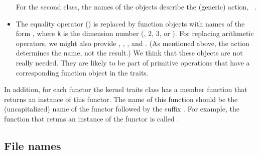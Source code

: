 \begin{itemize}
      For the second class, the names of the objects describe the (generic)
      action, \eg~.
\item The equality operator () is replaced by function
      objects with names of the form , where {\tt k} is
      the dimension number (\ie, 2, 3, or ).
      For replacing arithmetic operators, we might also provide ,
      , , and . (As mentioned
      above, the action determines the name, not the result.) We think
      that these objects are not really needed.  They are likely to be
      part of primitive operations that have a corresponding function
      object in the traits.
\end{itemize}

In addition, for each functor the kernel traits class has a member
function that returns an instance of this functor.  The name of this
function should be the (uncapitalized) name of the
functor followed by the suffix .%
For example, the function that retuns an instance of the
 functor is called .

\subsection*{File names}

